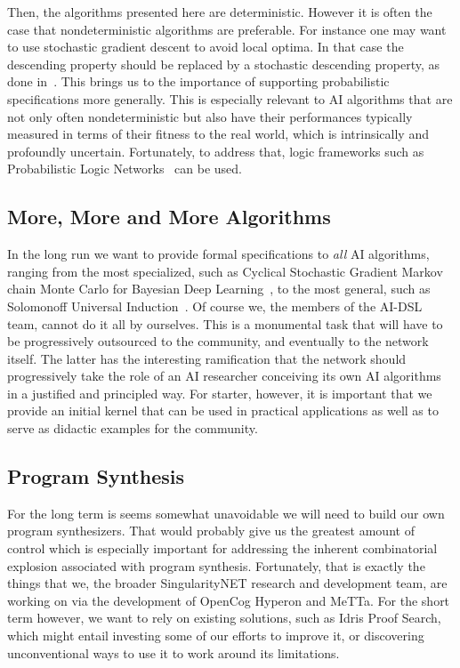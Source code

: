 \documentclass[]{report}
\begin{document}
Then, the algorithms presented here are deterministic.  However it is
often the case that nondeterministic algorithms are preferable.  For
instance one may want to use stochastic gradient descent to avoid
local optima.  In that case the descending property should be replaced
by a stochastic descending property, as done
in~\cite{DBLP:journals/corr/SelsamLD17}.  This brings us to the
importance of supporting probabilistic specifications more generally.
This is especially relevant to AI algorithms that are not only often
nondeterministic but also have their performances typically measured
in terms of their fitness to the real world, which is intrinsically
and profoundly uncertain.  Fortunately, to address that, logic
frameworks such as Probabilistic Logic Networks~\cite{Goertzel09PLN}
can be used.

\subsection{More, More and More Algorithms}
In the long run we want to provide formal specifications to \emph{all}
AI algorithms, ranging from the most specialized, such as Cyclical
Stochastic Gradient Markov chain Monte Carlo for Bayesian Deep
Learning~\cite{Zhang2020}, to the most general, such as Solomonoff
Universal Induction~\cite{Solomonoff1964}.  Of course we, the members
of the AI-DSL team, cannot do it all by ourselves.  This is a
monumental task that will have to be progressively outsourced to the
community, and eventually to the network itself.  The latter has the
interesting ramification that the network should progressively take
the role of an AI researcher conceiving its own AI algorithms in a
justified and principled way.  For starter, however, it is important
that we provide an initial kernel that can be used in practical
applications as well as to serve as didactic examples for the
community.

\subsection{Program Synthesis}

For the long term is seems somewhat unavoidable we will need to build
our own program synthesizers.  That would probably give us the
greatest amount of control which is especially important for
addressing the inherent combinatorial explosion associated with
program synthesis.  Fortunately, that is exactly the things that we,
the broader SingularityNET research and development team, are working
on via the development of OpenCog Hyperon and MeTTa.  For the short
term however, we want to rely on existing solutions, such as Idris
Proof Search, which might entail investing some of our efforts to
improve it, or discovering unconventional ways to use it to work
around its limitations.
\end{document}

